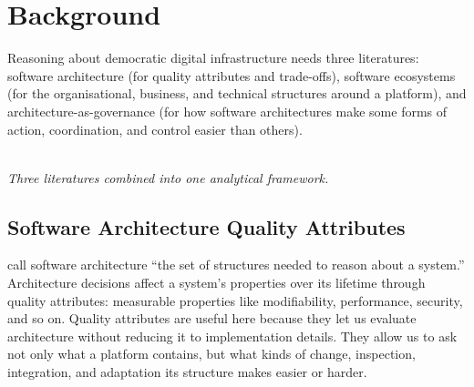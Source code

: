 \documentclass[11pt,a4paper]{article}
\begin{document}
\section{Background}\label{sec:background}

Reasoning about democratic digital infrastructure needs three literatures: software architecture (for quality attributes and trade-offs), software ecosystems (for the organisational, business, and technical structures around a platform), and architecture-as-governance (for how software architectures make some forms of action, coordination, and control easier than others).

\vspace{0.8em}
\begin{center}
\\[2pt]
{\footnotesize\itshape Three literatures combined into one analytical framework.}
\end{center}

\subsection{Software Architecture Quality Attributes}\label{sec:sa}

\citet[p.~4]{bass2021software} call software architecture ``the set of structures needed to reason about a system.'' Architecture decisions affect a system's properties over its lifetime through quality attributes: measurable properties like modifiability, performance, security, and so on. Quality attributes are useful here because they let us evaluate architecture without reducing it to implementation details. They allow us to ask not only what a platform contains, but what kinds of change, inspection, integration, and adaptation its structure makes easier or harder.
\end{document}
